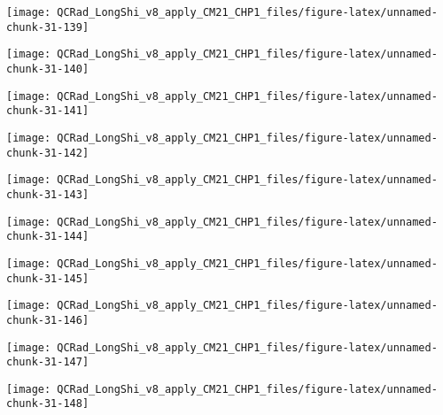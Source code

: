 \documentclass[
  10pt,
  a4paper,oneside]{article}
\begin{document}
\begin{center}\texttt{[image: QCRad\_LongShi\_v8\_apply\_CM21\_CHP1\_files/figure-latex/unnamed-chunk-31-139]} \end{center}

\begin{center}\texttt{[image: QCRad\_LongShi\_v8\_apply\_CM21\_CHP1\_files/figure-latex/unnamed-chunk-31-140]} \end{center}

\begin{center}\texttt{[image: QCRad\_LongShi\_v8\_apply\_CM21\_CHP1\_files/figure-latex/unnamed-chunk-31-141]} \end{center}

\begin{center}\texttt{[image: QCRad\_LongShi\_v8\_apply\_CM21\_CHP1\_files/figure-latex/unnamed-chunk-31-142]} \end{center}

\begin{center}\texttt{[image: QCRad\_LongShi\_v8\_apply\_CM21\_CHP1\_files/figure-latex/unnamed-chunk-31-143]} \end{center}

\begin{center}\texttt{[image: QCRad\_LongShi\_v8\_apply\_CM21\_CHP1\_files/figure-latex/unnamed-chunk-31-144]} \end{center}

\begin{center}\texttt{[image: QCRad\_LongShi\_v8\_apply\_CM21\_CHP1\_files/figure-latex/unnamed-chunk-31-145]} \end{center}

\begin{center}\texttt{[image: QCRad\_LongShi\_v8\_apply\_CM21\_CHP1\_files/figure-latex/unnamed-chunk-31-146]} \end{center}

\begin{center}\texttt{[image: QCRad\_LongShi\_v8\_apply\_CM21\_CHP1\_files/figure-latex/unnamed-chunk-31-147]} \end{center}

\begin{center}\texttt{[image: QCRad\_LongShi\_v8\_apply\_CM21\_CHP1\_files/figure-latex/unnamed-chunk-31-148]} \end{center}
\end{document}
